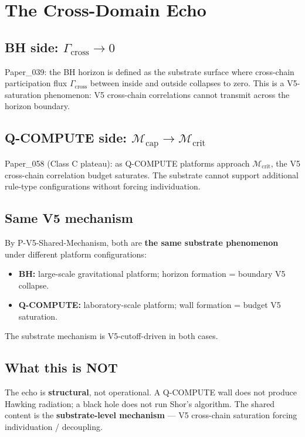 \documentclass[11pt,a4paper]{article}
\begin{document}
\section{The Cross-Domain Echo}

\subsection{BH side: $\Gamma_\mathrm{cross} \to 0$}

Paper\_039: the BH horizon is defined as the substrate surface where cross-chain participation flux $\Gamma_\mathrm{cross}$ between inside and outside collapses to zero. This is a V5-saturation phenomenon: V5 cross-chain correlations cannot transmit across the horizon boundary.

\subsection{Q-COMPUTE side: $\mathcal{M}_\mathrm{cap} \to \mathcal{M}_\mathrm{crit}$}

Paper\_058 (Class C plateau): as Q-COMPUTE platforms approach $\mathcal{M}_\mathrm{crit}$, the V5 cross-chain correlation budget saturates. The substrate cannot support additional rule-type configurations without forcing individuation.

\subsection{Same V5 mechanism}

By P-V5-Shared-Mechanism, both are \textbf{the same substrate phenomenon} under different platform configurations:

\begin{itemize}[noitemsep]
\item \textbf{BH:} large-scale gravitational platform; horizon formation = boundary V5 collapse.
\item \textbf{Q-COMPUTE:} laboratory-scale platform; wall formation = budget V5 saturation.
\end{itemize}

The substrate mechanism is V5-cutoff-driven in both cases.

\subsection{What this is NOT}

The echo is \textbf{structural}, not operational. A Q-COMPUTE wall does not produce Hawking radiation; a black hole does not run Shor's algorithm. The shared content is the \textbf{substrate-level mechanism} --- V5 cross-chain saturation forcing individuation / decoupling.
\end{document}

